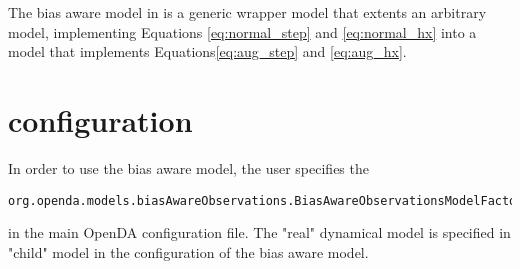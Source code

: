 The bias aware model in \oda is a generic wrapper model that extents an arbitrary \oda model, implementing Equations \ref{eq:normal_step} and \ref{eq:normal_hx} into a model that implements Equations\ref{eq:aug_step} and \ref{eq:aug_hx}.


\section{configuration}
In order to use the bias aware model, the user specifies the
\begin{verbatim}
org.openda.models.biasAwareObservations.BiasAwareObservationsModelFactory
\end{verbatim}
in the main OpenDA configuration file. The "real" dynamical model is specified in "child" model in the configuration of the bias aware model.


